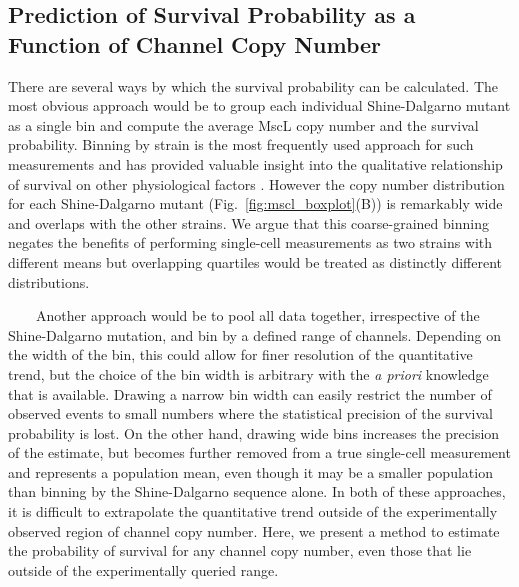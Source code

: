 \documentclass[12pt]{caltech_thesis}
\begin{document}
\hypertarget{prediction-of-survival-probability-as-a-function-of-channel-copy-number}{%
\subsection{Prediction of Survival Probability as a Function of Channel
Copy
Number}\label{prediction-of-survival-probability-as-a-function-of-channel-copy-number}}

There are several ways by which the survival probability can be
calculated. The most obvious approach would be to group each individual
Shine-Dalgarno mutant as a single bin and compute the average MscL copy
number and the survival probability. Binning by strain is the most
frequently used approach for such measurements and has provided valuable
insight into the qualitative relationship of survival on other
physiological factors \autocite{bialecka-fornal2015,vandenberg2016}.
However the copy number distribution for each Shine-Dalgarno mutant
(Fig.~\ref{fig:mscl_boxplot}(B)) is remarkably wide and overlaps with
the other strains. We argue that this coarse-grained binning negates the
benefits of performing single-cell measurements as two strains with
different means but overlapping quartiles would be treated as distinctly
different distributions.

~~~~Another approach would be to pool all data together, irrespective of
the Shine-Dalgarno mutation, and bin by a defined range of channels.
Depending on the width of the bin, this could allow for finer resolution
of the quantitative trend, but the choice of the bin width is arbitrary
with the \emph{a priori} knowledge that is available. Drawing a narrow
bin width can easily restrict the number of observed events to small
numbers where the statistical precision of the survival probability is
lost. On the other hand, drawing wide bins increases the precision of
the estimate, but becomes further removed from a true single-cell
measurement and represents a population mean, even though it may be a
smaller population than binning by the Shine-Dalgarno sequence alone. In
both of these approaches, it is difficult to extrapolate the
quantitative trend outside of the experimentally observed region of
channel copy number. Here, we present a method to estimate the
probability of survival for any channel copy number, even those that lie
outside of the experimentally queried range.
\end{document}
